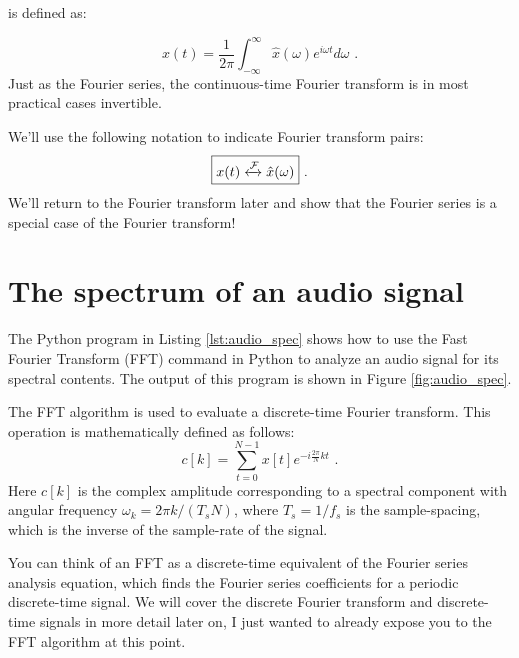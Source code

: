  is defined as:

\begin{equation}
  \boxed{
    x(t) = \frac{1}{2\pi}\int_{-\infty}^{\infty} \hat{x}(\omega) e^{i\omega t}d\omega
  } \,\,.
\end{equation}
Just as the Fourier series, the continuous-time Fourier transform is in most practical cases invertible.

We'll use the following notation to indicate Fourier transform pairs:
\begin{equation}
  \boxed{
    x(t) \xleftrightarrow{\mathcal{F}} \hat{x}(\omega)
  } \,\,.
\end{equation}
We'll return to the Fourier transform later and show that the Fourier series is a special case of the Fourier transform!

\section{The spectrum of an audio signal}

The Python program in Listing \ref{lst:audio_spec} shows how to use the Fast Fourier Transform (FFT)
command in Python to analyze an audio signal for its spectral contents.
The output of this program is shown in Figure \ref{fig:audio_spec}.

The FFT algorithm is used to evaluate a discrete-time Fourier transform.
This operation is mathematically defined as follows:
\begin{equation}
  c[k] = \sum_{t=0}^{N-1} x[t] e^{-i\frac{2\pi}{N}kt} \,\,.
\end{equation}
Here $c[k]$ is the complex amplitude corresponding to a spectral component with angular frequency $\omega_k = 2\pi k/(T_s N)$, where $T_s=1/f_s$ is the sample-spacing, which is the inverse of the sample-rate of the signal.

You can think of an FFT as a discrete-time equivalent of the Fourier series analysis equation, 
which finds the Fourier series coefficients for a periodic discrete-time signal. 
We will cover the discrete Fourier transform and discrete-time signals in more detail later on, 
I just wanted to already expose you to the FFT algorithm at this point.



